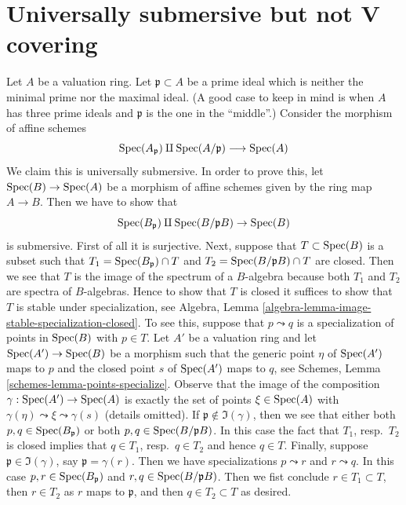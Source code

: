 \section{Universally submersive but not V covering}
\label{section-universally-submersive-not-V}

\noindent
Let $A$ be a valuation ring. Let $\mathfrak p \subset A$ be a prime
ideal which is neither the minimal prime nor the maximal ideal.
(A good case to keep in mind is when $A$ has three prime ideals
and $\mathfrak p$ is the one in the ``middle''.)
Consider the morphism of affine schemes
$$
\mathop{\mathrm{Spec}}(A_\mathfrak p) \amalg \mathop{\mathrm{Spec}}(A/\mathfrak p) \longrightarrow \mathop{\mathrm{Spec}}(A)
$$
We claim this is universally submersive. In order to prove this, let
$\mathop{\mathrm{Spec}}(B) \to \mathop{\mathrm{Spec}}(A)$ be a morphism of affine schemes given by the ring
map $A \to B$. Then we have to show that
$$
\mathop{\mathrm{Spec}}(B_\mathfrak p) \amalg \mathop{\mathrm{Spec}}(B/\mathfrak pB) \to \mathop{\mathrm{Spec}}(B)
$$
is submersive. First of all it is surjective. Next, suppose that
$T \subset \mathop{\mathrm{Spec}}(B)$ is a subset such that
$T_1 = \mathop{\mathrm{Spec}}(B_\mathfrak p) \cap T$ and $T_2 = \mathop{\mathrm{Spec}}(B/\mathfrak p B) \cap T$
are closed. Then we see that $T$ is the image of the spectrum
of a $B$-algebra because both $T_1$ and $T_2$ are spectra of $B$-algebras.
Hence to show that $T$ is closed it suffices to show that
$T$ is stable under specialization, see
Algebra, Lemma \ref{algebra-lemma-image-stable-specialization-closed}.
To see this, suppose that $p \leadsto q$ is a specialization
of points in $\mathop{\mathrm{Spec}}(B)$ with $p \in T$.
Let $A'$ be a valuation ring and let $\mathop{\mathrm{Spec}}(A') \to \mathop{\mathrm{Spec}}(B)$
be a morphism such that the generic point $\eta$ of $\mathop{\mathrm{Spec}}(A')$
maps to $p$ and the closed point $s$ of $\mathop{\mathrm{Spec}}(A')$ maps to $q$, see
Schemes, Lemma \ref{schemes-lemma-points-specialize}.
Observe that the image of the composition $\gamma : \mathop{\mathrm{Spec}}(A') \to \mathop{\mathrm{Spec}}(A)$
is exactly the set of points $\xi \in \mathop{\mathrm{Spec}}(A)$ with
$\gamma(\eta) \leadsto \xi \leadsto \gamma(s)$ (details omitted).
If $\mathfrak p \not \in \Im(\gamma)$, then we see that
either both $p, q \in \mathop{\mathrm{Spec}}(B_\mathfrak p)$ or
both $p, q \in \mathop{\mathrm{Spec}}(B/\mathfrak pB)$.
In this case the fact that $T_1$, resp.\ $T_2$ is closed
implies that $q \in T_1$, resp.\ $q \in T_2$ and hence $q \in T$.
Finally, suppose $\mathfrak p \in \Im(\gamma)$, say
$\mathfrak p = \gamma(r)$. Then we have specializations
$p \leadsto r$ and $r \leadsto q$. In this case
$p, r \in \mathop{\mathrm{Spec}}(B_\mathfrak p)$ and $r, q \in \mathop{\mathrm{Spec}}(B/\mathfrak pB)$.
Then we fist conclude $r \in T_1 \subset T$, then
$r \in T_2$ as $r$ maps to $\mathfrak p$, and then $q \in T_2 \subset T$
as desired.


